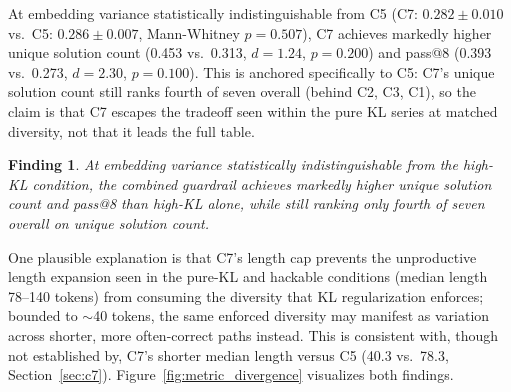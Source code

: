 \documentclass{article}
\newtheorem{finding}{Finding}
\begin{document}
At embedding variance statistically indistinguishable from C5 (C7: $0.282\pm0.010$ vs.\ C5: $0.286\pm0.007$, Mann-Whitney $p=0.507$), C7 achieves markedly higher unique solution count (0.453 vs.\ 0.313, $d=1.24$, $p=0.200$) and pass@8 (0.393 vs.\ 0.273, $d=2.30$, $p=0.100$). This is anchored specifically to C5: C7's unique solution count still ranks fourth of seven overall (behind C2, C3, C1), so the claim is that C7 escapes the tradeoff seen within the pure KL series at matched diversity, not that it leads the full table.

\begin{finding}
\label{find:c7escape}
At embedding variance statistically indistinguishable from the high-KL condition, the combined guardrail achieves markedly higher unique solution count and pass@8 than high-KL alone, while still ranking only fourth of seven overall on unique solution count.
\end{finding}

One plausible explanation is that C7's length cap prevents the unproductive length expansion seen in the pure-KL and hackable conditions (median length 78--140 tokens) from consuming the diversity that KL regularization enforces; bounded to $\sim$40 tokens, the same enforced diversity may manifest as variation across shorter, more often-correct paths instead. This is consistent with, though not established by, C7's shorter median length versus C5 (40.3 vs.\ 78.3, Section~\ref{sec:c7}). Figure~\ref{fig:metric_divergence} visualizes both findings.
\end{document}
